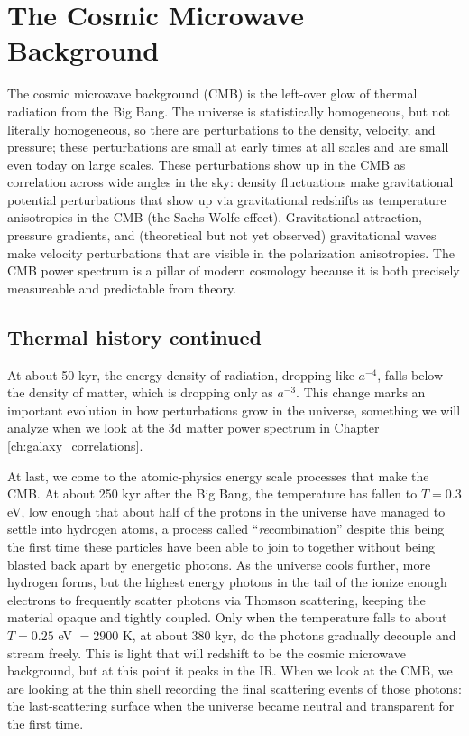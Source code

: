 \chapter{The Cosmic Microwave Background} \label{ch:CMB}

The cosmic microwave background (CMB) is the left-over glow of thermal radiation from the Big Bang.  The universe is statistically homogeneous, but not literally homogeneous, so there are perturbations to the density, velocity, and pressure; these perturbations are small at early times at all scales and are small even today on large scales.  These perturbations show up in the CMB as correlation across wide angles in the sky: density fluctuations make gravitational potential perturbations that show up via gravitational redshifts as temperature anisotropies in the CMB (the Sachs-Wolfe effect).  Gravitational attraction, pressure gradients, and (theoretical but not yet observed) gravitational waves make velocity perturbations that are visible in the polarization anisotropies.  The CMB power spectrum is a pillar of modern cosmology because it is both precisely measureable and predictable from theory.

\section{Thermal history continued}

At about 50 kyr, the energy density of radiation, dropping like $a^{-4}$, falls below the density of matter, which is dropping only as $a^{-3}$.  This change marks an important evolution in how perturbations grow in the universe, something we will analyze when we look at the 3d matter power spectrum in Chapter \ref{ch:galaxy_correlations}.

At last, we come to the atomic-physics energy scale processes that make the CMB.
At about 250 kyr after the Big Bang, the temperature has fallen to $T = 0.3$ eV, low enough that about half of the protons in the universe have managed to settle into hydrogen atoms, a process called ``\textit{re}combination'' despite this being the first time these particles have been able to join to together without being blasted back apart by energetic photons.  As the universe cools further, more hydrogen forms, but the highest energy photons in the tail of the ionize enough electrons to frequently scatter photons via Thomson scattering, keeping the material opaque and tightly coupled.  Only when the temperature falls to about $T = 0.25$ eV $= 2900$ K, at about 380 kyr,  do the photons gradually decouple and stream freely.  This is light that will redshift to be the cosmic microwave background, but at this point it peaks in the IR.  When we look at the CMB, we are looking at the thin shell recording the final scattering events of those photons: the last-scattering surface when the universe became neutral and transparent for the first time.

